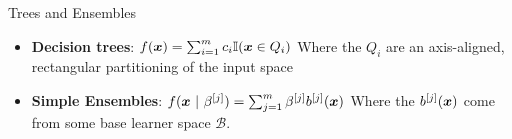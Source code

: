 \begin{vbframe}{Trees and Ensembles}

\begin{itemize}
  \item \textbf{Decision trees}: $f(\bm{x}) = \sum_{i = 1}^m c_i \mathbb{I}(\bm{x} \in Q_i)$ 
    Where the $Q_i$ are an axis-aligned, rectangular partitioning of the input space
  \begin{figure}
    \centering
  \end{figure}

\item \textbf{Simple Ensembles}: $ f(\bm{x}~|~\beta^{[j]}) = \sum_{j=1}^m \beta^{[j]} b^{[j]}(\bm{x})$  Where the $b^{[j]}(\bm{x})$ come from some base learner space $\mathcal{B}$.
  \begin{figure}
    \centering
  \end{figure}

  \end{itemize}

\end{vbframe}

